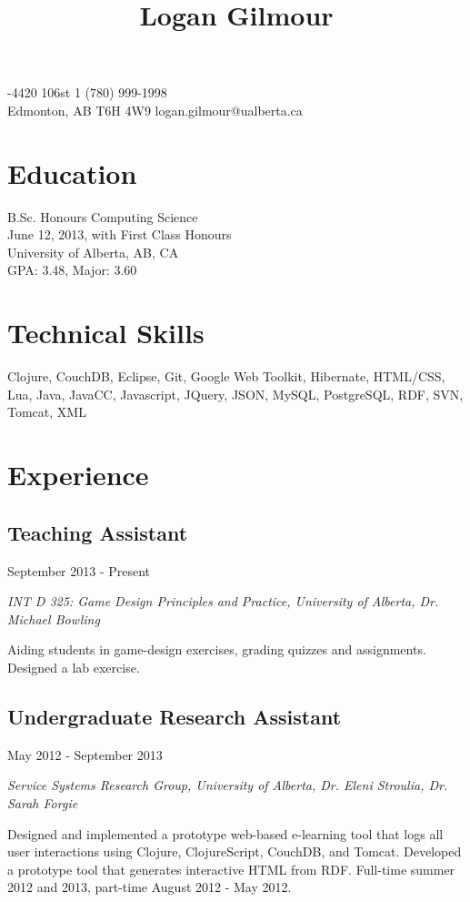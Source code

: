 \documentclass[10pt]{article}
\title{\bfseries\Large Logan Gilmour}
\author{}
\date{}
\begin{document}
\maketitle
{}-4420 106st \hfill 1 (780) 999-1998\\
Edmonton, AB  T6H 4W9 \hfill logan.gilmour@ualberta.ca
\section*{Education}
B.Sc. Honours Computing Science\\
June 12, 2013, with First Class Honours\\
University of Alberta, AB, CA\\
GPA: 3.48, Major: 3.60

\section*{Technical Skills}
Clojure, CouchDB, Eclipse, Git, Google Web Toolkit, Hibernate, HTML/CSS, Lua, Java, JavaCC, Javascript, JQuery, JSON, MySQL, PostgreSQL, RDF, SVN, Tomcat, XML

\section*{Experience}

\subsection*{Teaching Assistant}
September 2013 - Present

\emph{INT D 325: Game Design Principles and Practice, University of Alberta, Dr. Michael Bowling}
\vspace{\baselineskip}

Aiding students in game-design exercises, grading quizzes and assignments. Designed a lab exercise.

\subsection*{Undergraduate Research Assistant}
May 2012 - September 2013

\emph{Service Systems Research Group, University of Alberta, Dr. Eleni Stroulia, Dr. Sarah Forgie}
\vspace{\baselineskip}

Designed and implemented a prototype web-based e-learning tool that logs all user interactions using Clojure, ClojureScript, CouchDB, and Tomcat. Developed a prototype tool that generates interactive HTML from RDF. Full-time summer 2012 and 2013, part-time August 2012 - May 2012.
\end{document}
